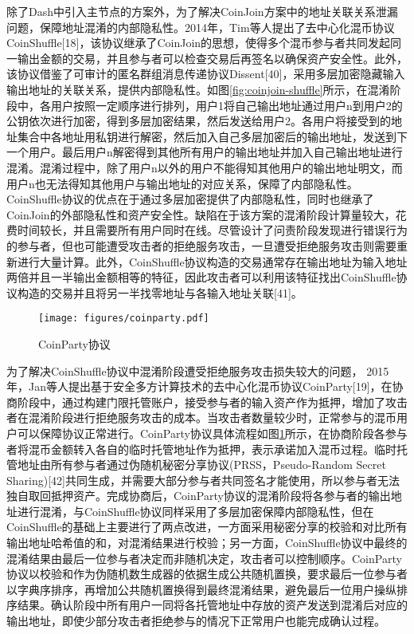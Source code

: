 除了Dash中引入主节点的方案外，为了解决CoinJoin方案中的地址关联关系泄漏问题，保障地址混淆的内部隐私性。2014年，Tim等人提出了去中心化混币协议CoinShuffle[18]，该协议继承了CoinJoin的思想，使得多个混币参与者共同发起同一输出金额的交易，并且参与者可以检查交易后再签名以确保资产安全性。此外，该协议借鉴了可审计的匿名群组消息传递协议Dissent[40]，采用多层加密隐藏输入输出地址的关联关系，提供内部隐私性。如图\ref{fig:coinjoin-shuffle}所示，在混淆阶段中，各用户按照一定顺序进行排列，用户1将自己输出地址通过用户n到用户2的公钥依次进行加密，得到多层加密结果，然后发送给用户2。各用户将接受到的地址集合中各地址用私钥进行解密，然后加入自己多层加密后的输出地址，发送到下一个用户。最后用户n解密得到其他所有用户的输出地址并加入自己输出地址进行混淆。混淆过程中，除了用户n以外的用户不能得知其他用户的输出地址明文，而用户n也无法得知其他用户与输出地址的对应关系，保障了内部隐私性。CoinShuffle协议的优点在于通过多层加密提供了内部隐私性，同时也继承了CoinJoin的外部隐私性和资产安全性。缺陷在于该方案的混淆阶段计算量较大，花费时间较长，并且需要所有用户同时在线。尽管设计了问责阶段发现进行错误行为的参与者，但也可能遭受攻击者的拒绝服务攻击，一旦遭受拒绝服务攻击则需要重新进行大量计算。此外，CoinShuffle协议构造的交易通常存在输出地址为输入地址两倍并且一半输出金额相等的特征，因此攻击者可以利用该特征找出CoinShuffle协议构造的交易并且将另一半找零地址与各输入地址关联[41]。

\begin{figure}
\centering
\texttt{[image: figures/coinparty.pdf]}
\caption{CoinParty协议}
\label{fig:coinparty}
\end{figure}

为了解决CoinShuffle协议中混淆阶段遭受拒绝服务攻击损失较大的问题， 2015年，Jan等人提出基于安全多方计算技术的去中心化混币协议CoinParty[19]，在协商阶段中，通过构建门限托管账户，接受参与者的输入资产作为抵押，增加了攻击者在混淆阶段进行拒绝服务攻击的成本。当攻击者数量较少时，正常参与的混币用户可以保障协议正常进行。CoinParty协议具体流程如图\ref{fig:coinparty}所示，在协商阶段各参与者将混币金额转入各自的临时托管地址作为抵押，表示承诺加入混币过程。临时托管地址由所有参与者通过伪随机秘密分享协议(PRSS，Pseudo-Random Secret Sharing)[42]共同生成，并需要大部分参与者共同签名才能使用，所以参与者无法独自取回抵押资产。完成协商后，CoinParty协议的混淆阶段将各参与者的输出地址进行混淆，与CoinShuffle协议同样采用了多层加密保障内部隐私性，但在CoinShuffle的基础上主要进行了两点改进，一方面采用秘密分享的校验和对比所有输出地址哈希值的和，对混淆结果进行校验；另一方面，CoinShuffle协议中最终的混淆结果由最后一位参与者决定而非随机决定，攻击者可以控制顺序。CoinParty协议以校验和作为伪随机数生成器的依据生成公共随机置换，要求最后一位参与者以字典序排序，再增加公共随机置换得到最终混淆结果，避免最后一位用户操纵排序结果。确认阶段中所有用户一同将各托管地址中存放的资产发送到混淆后对应的输出地址，即使少部分攻击者拒绝参与的情况下正常用户也能完成确认过程。


